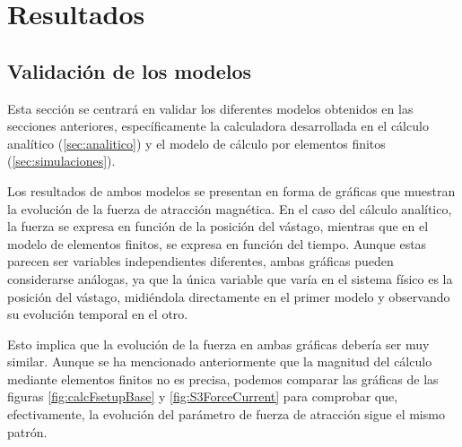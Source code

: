\section{Resultados}
\label{sec:resultados}
\subsection{Validación de los modelos}
\label{subsec:validacionModelos}

Esta sección se centrará en validar los diferentes modelos obtenidos en las secciones anteriores, específicamente la calculadora desarrollada en el cálculo analítico (\ref{sec:analitico}) y el modelo de cálculo por elementos finitos (\ref{sec:simulaciones}).

Los resultados de ambos modelos se presentan en forma de gráficas que muestran la evolución de la fuerza de atracción magnética. En el caso del cálculo analítico, la fuerza se expresa en función de la posición del vástago, mientras que en el modelo de elementos finitos, se expresa en función del tiempo. Aunque estas parecen ser variables independientes diferentes, ambas gráficas pueden considerarse análogas, ya que la única variable que varía en el sistema físico es la posición del vástago, midiéndola directamente en el primer modelo y observando su evolución temporal en el otro.

Esto implica que la evolución de la fuerza en ambas gráficas debería ser muy similar. Aunque se ha mencionado anteriormente que la magnitud del cálculo mediante elementos finitos no es precisa, podemos comparar las gráficas de las figuras \ref{fig:calcFsetupBase} y \ref{fig:S3ForceCurrent} para comprobar que, efectivamente, la evolución del parámetro de fuerza de atracción sigue el mismo patrón.

